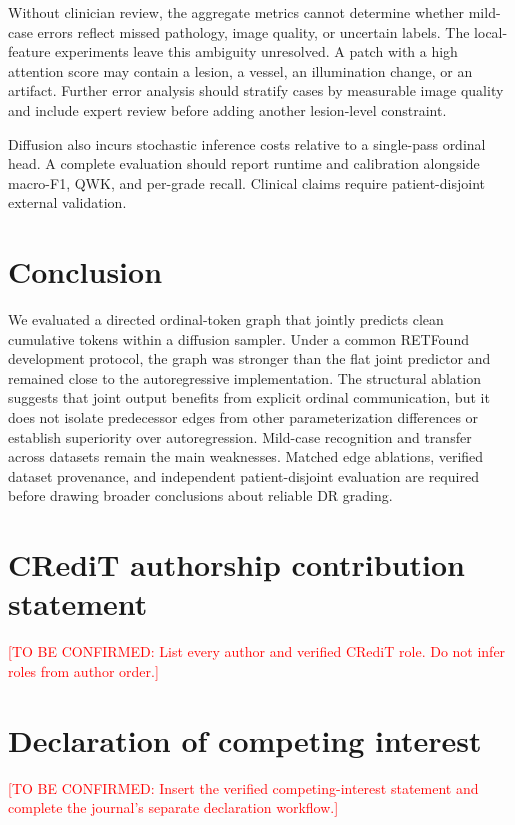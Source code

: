 \documentclass[a4paper,fleqn]{cas-sc}
\newcommand{\tbc}[1]{\textcolor{red}{[TO BE CONFIRMED: #1]}}
\begin{document}
Without clinician review, the aggregate metrics cannot determine whether mild-case errors reflect missed pathology, image quality, or uncertain labels. The local-feature experiments leave this ambiguity unresolved. A patch with a high attention score may contain a lesion, a vessel, an illumination change, or an artifact. Further error analysis should stratify cases by measurable image quality and include expert review before adding another lesion-level constraint.

Diffusion also incurs stochastic inference costs relative to a single-pass ordinal head. A complete evaluation should report runtime and calibration alongside macro-F1, QWK, and per-grade recall. Clinical claims require patient-disjoint external validation.

\section{Conclusion}
\label{sec:conclusion}

We evaluated a directed ordinal-token graph that jointly predicts clean cumulative tokens within a diffusion sampler. Under a common RETFound development protocol, the graph was stronger than the flat joint predictor and remained close to the autoregressive implementation. The structural ablation suggests that joint output benefits from explicit ordinal communication, but it does not isolate predecessor edges from other parameterization differences or establish superiority over autoregression. Mild-case recognition and transfer across datasets remain the main weaknesses. Matched edge ablations, verified dataset provenance, and independent patient-disjoint evaluation are required before drawing broader conclusions about reliable DR grading.

\section*{CRediT authorship contribution statement}
\tbc{List every author and verified CRediT role. Do not infer roles from author order.}

\section*{Declaration of competing interest}
\tbc{Insert the verified competing-interest statement and complete the journal's separate declaration workflow.}
\end{document}
